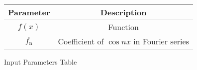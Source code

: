 \centering
\begin{tabular}{|c|c|}
	\hline
	\textbf{Parameter} & \textbf{Description} \\
	\hline
	$f(x)$ & Function \\
	\hline
	$f_{\text{n}}$ & Coefficient of $\cos{nx}$ in Fourier series\\
	\hline
\end{tabular}
\caption{Input Parameters Table}
\label{tab:gateCE22.30.1}
